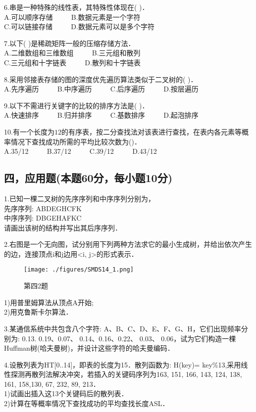 6.串是一种特殊的线性表，其特殊性体现在( )． \\
A.可以顺序存储 $\qquad$ B.数据元素是一个字符 \\
C.可以链接存储 $\qquad$ D.数据元素可以是多个字符

7.以下( )是稀疏矩阵一般的压缩存储方法． \\
A.二维数组和三维数组 $\qquad$ B.三元组和散列 \\
C.三元组和十字链表 $\qquad$ D.散列和十字链表

8.采用邻接表存储的图的深度优先遍历算法类似于二叉树的( )． \\
A.先序遍历 $\qquad$ B.中序遍历 $\qquad$ C.后序遍历 $\qquad$ D.按层遍历

9.以下不需进行关键字的比较的排序方法是(  )． \\
A.快速排序 $\qquad$ B.归并排序 $\qquad$ C.基数排序 $\qquad$ D.起泡排序

10.有一个长度为$12$的有序表，按二分查找法对该表进行查找，在表内各元素等概率情况下查找成功所需的平均比较次数为()． \\
A.35/12 $\qquad$ B.37/12 $\qquad$ C.39/12 $\qquad$ D.43/12

\subsection{四，应用题(本题60分，每小题10分)}

1.已知一棵二叉树的先序序列和中序序列分别为， \\
先序序列: ABDEGHCFK \\
中序序列: DBGEHAFKC \\
请画出该树的结构并写出其后序序列．

2.右图是一个无向图，试分别用下列两种方法求它的最小生成树，并给出依次产生的边，连接顶点i和j边用<i, j>的形式表示．
\begin{figure}[ht]
\centering
\texttt{[image: ./figures/SMDS14\_1.png]}
\caption{第四2题} \label{SMDS14_fig1}
\end{figure}
1)用普里姆算法从顶点A开始; \\
2)用克鲁斯卡尔算法．

3.某通信系统中共包含八个字符: A、B、C、D、E、F、G、H，它们出现频率分别为: 0.13. 0.19、0.07、 0.14、0.16、0.22、 0.03、 0.06，试为它们构造一棵Huffman树(哈夫曼树)，并设计这些字符的哈夫曼编码．

4.设散列表为HT[0..14]，即表的长度为15．散列函数为: H(key)= key\%13,采用线性探测再散列法解决冲突，若插入的关键码序列为{163, 151, 166, 143, 124, 138, 161, 158,130, 67, 232, 89, 213}． \\
1)试画出插入这13个关键码后的散列表． \\
2)计算在等概率情况下查找成功的平均查找长度ASL．

